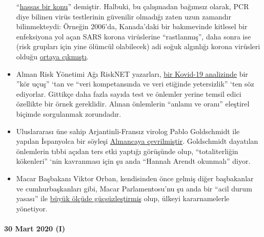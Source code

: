 \begin{itemize}
  ``\href{https://www.npr.org/sections/health-shots/2020/03/26/822084429/in-defense-of-coronavirus-testing-strategy-administration-cited-retracted-study}{hassas
  bir konu}'' demiştir. Halbuki, bu çalışmadan bağımsız olarak, PCR diye
  bilinen virüs testlerinin güvenilir olmadığı zaten uzun zamandır
  bilinmekteydi: Örneğin 2006'da, Kanada'daki bir bakımevinde kitlesel
  bir enfeksiyona yol açan SARS korona virüslerine ``rastlanmış'', daha
  sonra ise (risk grupları için yine ölümcül olabilecek) adi soğuk
  algınlığı korona virüsleri olduğu
  \href{https://www.ncbi.nlm.nih.gov/pmc/articles/PMC2095096/}{ortaya
  çıkmıştı}.
\item
  Alman Risk Yönetimi Ağı RiskNET yazarları,
  \href{https://www.risknet.de/themen/risknews/covid-19-und-der-blindflug/}{bir
  Kovid-19 analizinde} bir ''kör uçuş'' `tan ve ``veri kompetansında ve
  veri etiğinde yetersizlik'' `ten söz ediyorlar. Gittikçe daha fazla
  sayıda test ve önlemler yerine temsil edici özellikte bir örnek
  gereklidir. Alınan önlemlerin ``anlamı ve oranı'' eleştirel biçimde
  sorgulanmak zorundadır.
\item
  Uluslararası üne sahip Arjantinli-Fransız virolog Pablo Goldschmidt
  ile yapılan İspanyolca bir söyleşi
  \href{https://www.rubikon.news/artikel/der-corona-totalitarismus}{Almancaya
  çevrilmiştir}. Goldschmidt dayatılan önlemlerin tıbbi açıdan ters etki
  yaptığı görüşünde olup, ``totaliterliğin kökenleri'' `nin kavranması
  için şu anda ``Hannah Arendt okunmalı'' diyor.
\item
  Macar Başbakanı Viktor Orban, kendisinden önce gelmiş diğer
  başbakanlar ve cumhurbaşkanları gibi, Macar Parlamentosu'nu şu anda
  bir ``acil durum yasası'' ile
  \href{https://www.krone.at/2127086}{büyük ölçüde güçsüzleştirmiş}
  olup, ülkeyi kararnamelerle yönetiyor.
\end{itemize}

\hypertarget{30-mart-2020-i}{%
\paragraph{30 Mart 2020 (I)}\label{30-mart-2020-i}}

